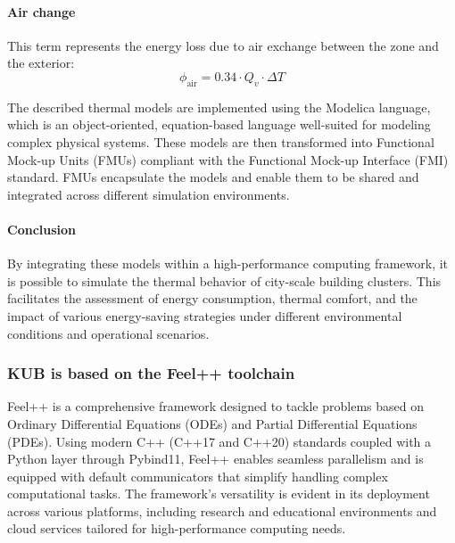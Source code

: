 \documentclass[runningheads]{llncs}
\begin{document}
\paragraph{Air change} This term represents the energy loss due to air exchange between the zone and the exterior:
\begin{equation}
  \phi_{\mathrm{air}} = 0.34 \cdot Q_v \cdot \Delta T
\end{equation}

The described thermal models are implemented using the Modelica language, which is an object-oriented, equation-based language well-suited for modeling complex physical systems. 
These models are then transformed into Functional Mock-up Units (FMUs) compliant with the Functional Mock-up Interface (FMI) standard. 
FMUs encapsulate the models and enable them to be shared and integrated across different simulation environments.


\paragraph{Conclusion} By integrating these models within a high-performance computing framework, it is possible to simulate the thermal behavior of city-scale building clusters.
This facilitates the assessment of energy consumption, thermal comfort, and the impact of various energy-saving strategies under different environmental conditions and operational scenarios.

\subsubsection{KUB is based on the Feel++ toolchain}

Feel++ is a comprehensive framework designed to tackle problems based on Ordinary Differential Equations (ODEs) and Partial Differential Equations (PDEs). 
Using modern C++ (C++17 and C++20) standards coupled with a Python layer through Pybind11, Feel++ enables seamless parallelism and is equipped with default communicators that simplify handling complex computational tasks.
The framework's versatility is evident in its deployment across various platforms, including research and educational environments and cloud services tailored for high-performance computing needs.
\end{document}
